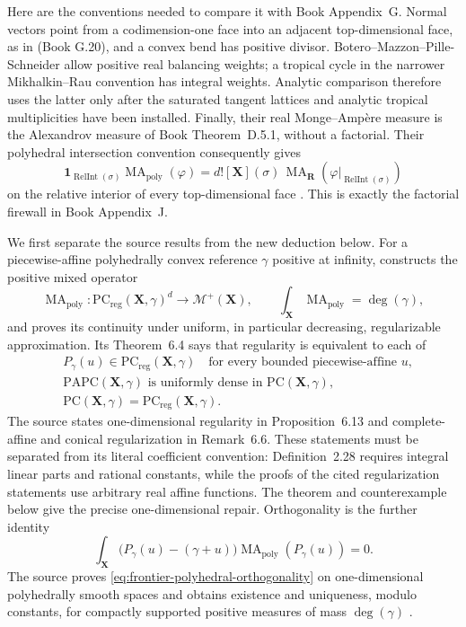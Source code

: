 \documentclass[11pt,a4paper]{article}
\theoremstyle{definition}
\theoremstyle{remark}
\newcommand{\one}{\mathbf 1}
\DeclareMathOperator{\RelInt}{RelInt}
\DeclareMathOperator{\MA}{MA}
\begin{document}
Here are the conventions needed to compare it with
Book Appendix~G.  Normal vectors point from a codimension-one
face into an adjacent top-dimensional face, as in
\textup{(Book G.20)}, and a convex bend has positive divisor.
Botero--Mazzon--Pille-Schneider allow positive real balancing weights; a
tropical cycle in the narrower Mikhalkin--Rau convention has integral
weights.  Analytic comparison therefore uses the latter only after the
saturated tangent lattices and analytic tropical multiplicities have been
installed.  Finally, their real Monge--Amp\`ere measure is the Alexandrov
measure of Book Theorem~D.5.1, without a factorial.  Their
polyhedral intersection convention consequently gives
\begin{equation}
 \one_{\RelInt(\sigma)}\MA_{\mathrm{poly}}(\varphi)
 =d![\mathbf X](\sigma)\,
   \MA_{\mathbf R}(\varphi|_{\RelInt(\sigma)})
 \label{eq:frontier-polyhedral-real-local}
\end{equation}
on the relative interior of every top-dimensional face
\cite[Propositions~4.12 and~4.20]{BMPS26}.  This is exactly the factorial
firewall in Book Appendix~J.

We first separate the source results from the new deduction below.  For a
piecewise-affine polyhedrally convex reference \(\gamma\) positive at
infinity, \cite[Theorem~4.13 and Proposition~4.16]{BMPS26} constructs the
positive mixed operator
\[
 \MA_{\mathrm{poly}}:
 \mathrm{PC}_{\mathrm{reg}}(\mathbf X,\gamma)^d
 \longrightarrow\mathcal M^+(\mathbf X),
 \qquad
 \int_{\mathbf X}\MA_{\mathrm{poly}}=\deg(\gamma),
\]
and proves its continuity under uniform, in particular decreasing,
regularizable approximation.  Its Theorem~6.4 says that regularity is
equivalent to each of
\[
 \begin{split}
 &P_\gamma(u)\in\mathrm{PC}_{\mathrm{reg}}(\mathbf X,\gamma)
       \quad\text{for every bounded piecewise-affine }u,\\
 &\mathrm{PAPC}(\mathbf X,\gamma)
       \text{ is uniformly dense in }\mathrm{PC}(\mathbf X,\gamma),\\
 &\mathrm{PC}(\mathbf X,\gamma)
       =\mathrm{PC}_{\mathrm{reg}}(\mathbf X,\gamma).
 \end{split}
\]
The source states one-dimensional regularity in Proposition~6.13 and
complete-affine and conical regularization in Remark~6.6.  These statements
must be separated from its literal coefficient convention: Definition~2.28
requires integral linear parts and rational constants, while the proofs of
the cited regularization statements use arbitrary real affine functions.
The theorem and counterexample below give the precise one-dimensional
repair.  Orthogonality is the further
identity
\begin{equation}
 \int_{\mathbf X}
 \bigl(P_\gamma(u)-(\gamma+u)\bigr)
 \MA_{\mathrm{poly}}(P_\gamma(u))=0.
 \label{eq:frontier-polyhedral-orthogonality}
\end{equation}
The source proves \eqref{eq:frontier-polyhedral-orthogonality} on
one-dimensional polyhedrally smooth spaces and obtains existence and
uniqueness, modulo constants, for compactly supported positive measures of
mass \(\deg(\gamma)\)
\cite[Proposition~6.21 and Theorem~6.22]{BMPS26}.
\end{document}

